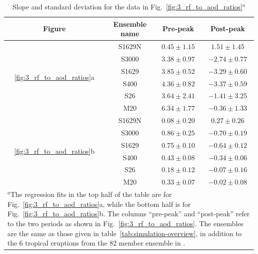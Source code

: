 \documentclass[draft]{agujournal2019}
\begin{document}
  \begin{table}
    \centering

    \caption{Slope and standard deviation for the data in
      Fig.~\ref{fig:3_rf_to_aod_ratios}\(^{a}\)}\label{tab:slope-gradients}%
    \begin{tabular}{cccc}
      \toprule
      Figure & Ensemble name & Pre-peak & Post-peak \\
      \midrule
      & S1629N & \(0.45\pm1.15\) & \(1.51\pm1.45\) \\
      & S3000 & \(3.38\pm0.97\) & \(-2.74\pm0.77\) \\
      \multirow{2}{*}{\ref{fig:3_rf_to_aod_ratios}a} & S1629 & \(3.85\pm0.52\) & \(-3.29\pm0.60\) \\
      & S400 & \(4.36\pm0.82\) & \(-3.37\pm0.59\) \\
      & S26 & \(3.64\pm2.41\) & \(-1.41\pm3.25\) \\
      & M20 & \(6.34\pm1.77\) & \(-0.36\pm1.33\) \\
      \midrule
      & S1629N & \(0.08\pm0.20\) & \(0.27\pm0.26\) \\
      & S3000 & \(0.86\pm0.25\) & \(-0.70\pm0.19\) \\
      \multirow{2}{*}{\ref{fig:3_rf_to_aod_ratios}b} & S1629 & \(0.75\pm0.10\) & \(-0.64\pm0.12\) \\
      & S400 & \(0.43\pm0.08\) & \(-0.34\pm0.06\) \\
      & S26 & \(0.18\pm0.12\) & \(-0.07\pm0.16\) \\
      & M20 & \(0.33\pm0.07\) & \(-0.02\pm0.08\) \\
      \toprule
      \multicolumn{4}{l}{\parbox{\linewidth}{\(^{a}\)The regression fits in the top half of the table are for
          Fig.~\ref{fig:3_rf_to_aod_ratios}a, while the bottom half is for
          Fig.~\ref{fig:3_rf_to_aod_ratios}b. The columns ``pre-peak'' and ``post-peak'' refer to
          the two periods as shown in Fig.~\ref{fig:3_rf_to_aod_ratios}. The ensembles are the
          same as those given in table~\ref{tab:simulation-overview}, in addition to the \(6\)
          tropical eruptions from the \(82\) member ensemble in
          .}} \\
    \end{tabular}
  \end{table}
\end{document}
